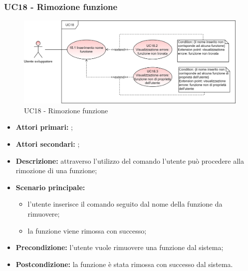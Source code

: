 \subsubsection{UC18 - Rimozione funzione}
\begin{figure}[h]
	\centering
	\includegraphics[scale=\ucs]{./res/img/UC18.png}
	\caption {UC18 - Rimozione funzione}
\end{figure}
\begin{itemize}
	\item \textbf{Attori primari:} \us{};
	\item \textbf{Attori secondari:} \re{};
	\item \textbf{Descrizione:} attraverso l’utilizzo del comando \delete{} l’utente può procedere alla rimozione di una funzione;  
	\item \textbf{Scenario principale:} 
	\begin{itemize}
		\item l’utente inserisce il comando \delete{} seguito dal nome della funzione da rimuovere; 
		\item la funzione viene rimossa con successo; 
	\end{itemize}
	\item \textbf{Precondizione:} l’utente vuole rimuovere una funzione dal sistema;  
	\item \textbf{Postcondizione:} la funzione è stata rimossa con successo dal sistema.
\end{itemize}
